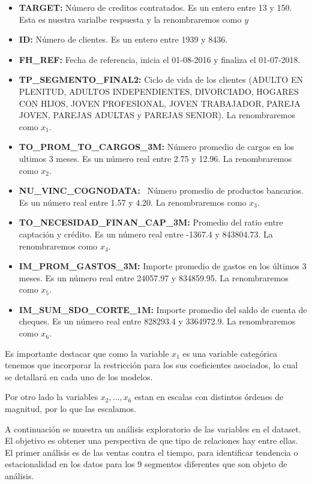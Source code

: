 \documentclass[]{article}
\begin{document}
\begin{itemize}
\item
  \textbf{TARGET:} Número de creditos contratados. Es un entero entre 13
  y 150. Esta es nuestra varialbe respuesta y la renombraremos como
  \(y\)
\item
  \textbf{ID:} Número de clientes. Es un entero entre 1939 y 8436.
\item
  \textbf{FH\_REF:} Fecha de referencia, inicia el 01-08-2016 y finaliza
  el 01-07-2018.
\item
  \textbf{TP\_SEGMENTO\_FINAL2:} Ciclo de vida de los clientes (ADULTO
  EN PLENITUD, ADULTOS INDEPENDIENTES, DIVORCIADO, HOGARES CON HIJOS,
  JOVEN PROFESIONAL, JOVEN TRABAJADOR, PAREJA JOVEN, PAREJAS ADULTAS y
  PAREJAS SENIOR). La renombraremos como \(x_1\).
\item
  \textbf{TO\_PROM\_TO\_CARGOS\_3M:} Número promedio de cargos en los
  ultimos 3 meses. Es un número real entre 2.75 y 12.96. La
  renombraremos como \(x_2\).
\item
  \textbf{NU\_VINC\_COGNODATA:}~ Número promedio de productos bancarios.
  Es un número real entre 1.57 y 4.20. La renombraremos como \(x_3\).
\item
  \textbf{TO\_NECESIDAD\_FINAN\_CAP\_3M:} Promedio del ratio entre
  captación y crédito. Es un número real entre -1367.4 y 843804.73. La
  renombraremos como \(x_4\).
\item
  \textbf{IM\_PROM\_GASTOS\_3M:} Importe promedio de gastos en los
  últimos 3 meses. Es un número real entre 24057.97 y 834859.95. La
  renombraremos como \(x_5\).
\item
  \textbf{IM\_SUM\_SDO\_CORTE\_1M:} Importe promedio del saldo de cuenta
  de cheques. Es un número real entre 828293.4 y 3364972.9. La
  renombraremos como \(x_6\).
\end{itemize}

Es importante destacar que como la variable \(x_1\) es una variable
categórica tenemos que incorporar la restricción para los sus
coeficientes asociados, lo cual se detallará en cada uno de los modelos.

Por otro lado la variables \(x_2, \ldots, x_6\) estan en escalas con
distintos órdenes de magnitud, por lo que las escalamos.

A continuación se muestra un análisis exploratorio de las variables en
el dataset. El objetivo es obtener una perspectiva de que tipo de
relaciones hay entre ellas. El primer análisis es de las ventas contra
el tiempo, para identificar tendencia o estacionalidad en los datos para
los 9 segmentos diferentes que son objeto de análisis.
\end{document}
